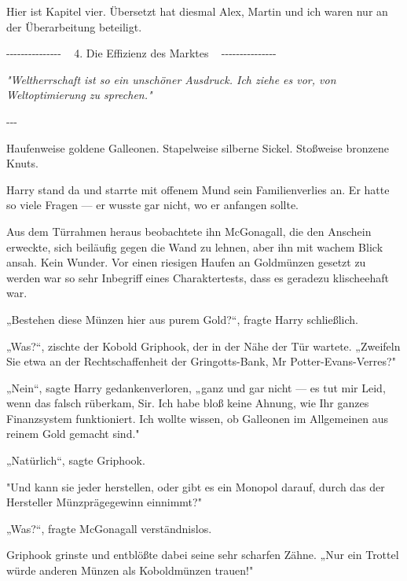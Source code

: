 

\hypertarget{die-effizienz-des-marktes}{%

Hier ist Kapitel vier. Übersetzt hat diesmal Alex, Martin und ich waren nur an der Überarbeitung beteiligt.

-\/-\/-\/-\/-\/-\/-\/-\/-\/-\/-\/-\/-\/-\/- ~ 4. Die Effizienz des Marktes ~ -\/-\/-\/-\/-\/-\/-\/-\/-\/-\/-\/-\/-\/-\/-

\emph{"Weltherrschaft ist so ein unschöner Ausdruck. Ich ziehe es vor, von Weltoptimierung zu sprechen."}

-\/-\/-

Haufenweise goldene Galleonen. Stapelweise silberne Sickel. Stoßweise bronzene Knuts.

Harry stand da und starrte mit offenem Mund sein Familienverlies an. Er hatte so viele Fragen --- er wusste gar nicht, wo er anfangen sollte.

Aus dem Türrahmen heraus beobachtete ihn McGonagall, die den Anschein erweckte, sich beiläufig gegen die Wand zu lehnen, aber ihn mit wachem Blick ansah. Kein Wunder. Vor einen riesigen Haufen an Goldmünzen gesetzt zu werden war so sehr Inbegriff eines Charaktertests, dass es geradezu klischeehaft war.

„Bestehen diese Münzen hier aus purem Gold?“, fragte Harry schließlich.

„Was?“, zischte der Kobold Griphook, der in der Nähe der Tür wartete. „Zweifeln Sie etwa an der Rechtschaffenheit der Gringotts-Bank, Mr Potter-Evans-Verres?"

„Nein“, sagte Harry gedankenverloren, „ganz und gar nicht --- es tut mir Leid, wenn das falsch rüberkam, Sir. Ich habe bloß keine Ahnung, wie Ihr ganzes Finanzsystem funktioniert. Ich wollte wissen, ob Galleonen im Allgemeinen aus reinem Gold gemacht sind."

„Natürlich“, sagte Griphook.

"Und kann sie jeder herstellen, oder gibt es ein Monopol darauf, durch das der Hersteller Münzprägegewinn einnimmt?"

„Was?“, fragte McGonagall verständnislos.

Griphook grinste und entblößte dabei seine sehr scharfen Zähne. „Nur ein Trottel würde anderen Münzen als Koboldmünzen trauen!"

}
